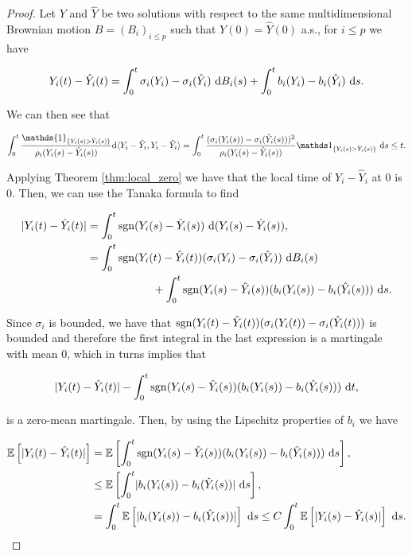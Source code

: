 \begin{proof}
    Let $Y$ and $\hat Y$ be two solutions with respect to the same multidimensional Brownian motion $B = (B_i)_{i \le p}$ such that $Y(0) = \hat Y(0)$ %
    a.s., for $i\le p$ we have

    \begin{equation}
        Y_i(t) - \hat Y_i(t) = \int_0^t \sigma_i(Y_i) - \sigma_i(\hat Y_i) ~\mathrm d B_i(s) + \int_0^t b_i(Y_i) - b_i(\hat Y_i) ~\mathrm d s.
    \end{equation}

    We can then see that

    \begin{equation*}
        \int_0^t \frac{\mathds{1}_{\{Y_i(s) > \hat Y_i(s)\}}}{\rho_i(Y_i(s)- \hat Y_i(s))} \d \langle Y_i - \hat Y_i, Y_i - \hat Y_i \rangle = \int_0^t \frac{( \sigma_i (Y_i(s)) - \sigma_i (\hat Y_i(s)) )^2}{\rho_i(Y_i(s) - \hat Y_i(s))} \mathds 1_{\{Y_i(s) > \hat Y_i(s)\}} ~\d s \le t.
    \end{equation*}
    
    Applying Theorem \ref{thm:local_zero} we have that the local time of $Y_i - \hat Y_i$ at 0 is 0. Then, we can use the Tanaka formula to find

    \begin{align*}
        \lvert  Y_i(t) - \hat Y_i(t)  \rvert &= \int_0^t \mathrm{sgn}(Y_i(s) - \hat Y_i(s)) ~\mathrm d( Y_i(s) - \hat Y_i(s) ),\\
        &= \int_0^t \mathrm{sgn}(Y_i(t) - \hat Y_i(t))(\sigma_i(Y_i) - \sigma_i(\hat Y_i)) ~\mathrm d B_i(s)\\
        &\phantom{espacioteeeee}+ \int_0^t \mathrm{sgn}(Y_i(s) - \hat Y_i(s))(b_i(Y_i(s)) - b_i(\hat Y_i(s))) ~ \mathrm d s.
    \end{align*}

    Since $\sigma_i$ is bounded, we have that $\mathrm{sgn}(Y_i(t) - \hat Y_i(t))(\sigma_i(Y_i(t)) - \sigma_i(\hat Y_i(t)))$ is bounded and therefore the first integral in the last expression is a martingale with mean 0, which in turns implies that

    \begin{equation*}
        \lvert  Y_i(t) - \hat Y_i(t)  \rvert - \int_0^t \mathrm{sgn}(Y_i(s) - \hat Y_i(s))(b_i(Y_i(s)) - b_i(\hat Y_i(s)))~\mathrm d t,
    \end{equation*}

    \noindent is a zero-mean martingale. Then, by using the Lipschitz properties of $b_i$ we have

    \begin{align*}
        \mathbb E \left[ \lvert Y_i(t) - \hat Y_i(t) \rvert \right] &= \mathbb E \left[   \int_0^t \mathrm{sgn}(Y_i(s) - \hat Y_i(s))(b_i(Y_i(s)) - b_i(\hat Y_i(s)))~\mathrm d s  \right],\\
        &\le \mathbb E \left[  \int_0^t \lvert b_i(Y_i(s)) - b_i(\hat Y_i(s)) \rvert~\mathrm d s \right],\\
        &= \int_0^t \mathbb E \left[  \lvert  b_i(Y_i(s)) - b_i(\hat Y_i(s))  \rvert  \right]~\mathrm d s 
        \le  C\int_0^t \mathbb E \left[ \lvert Y_i(s) - \hat Y_i(s) \rvert \right]~\mathrm d s.
    \end{align*}


\end{proof}
